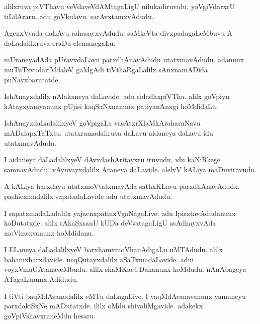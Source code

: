 \documentclass{article}
\begin{document}
\begin{mn}%
alilxruva piVThavu veVdaveVdAMtagaLigU nilukadiruvidu. yoVgiVdarxrU tiLilAraru. adu 
goVkulavu. sarAvxtamxvAdudu.
\end{mn}

\begin{mn}%
AgenxVyada daLAvu rahasayxvAdudu. saMkeVta divxpadagaLeMbuvu A daLadalilxruva eraDu 
elemanegaLu.
\end{mn}

\begin{mn}%
mUraneyadAda pUravxdaLavu parxdhAnavAdudu utatxmavAdudu. adanunx muTuTxvudariMdaleV 
gaMgAdi tiVthaRgaLalilx sAnxnamADida puNayxbarutatde.
\end{mn}

\begin{mn}%
IshAnayxdalilx nAlakxneya daLavide. adu sidadhxpiVTha. alilx goVpiyu kAtayxyaniyanunx pUjisi 
kaqSaNxnanunx patiyanAnxgi hoMdidaLu.
\end{mn}

\begin{mn}%
IshAnayxdaLadalilxyeV goVpigaLa vasAtxrXlaMkAraharaNavu mADalapxTaTxtu. utatxramadaliruva 
daLavu aidaneya daLavu idu utatxmavAdudu.
\end{mn}

\begin{mn}%
I aidaneya daLadalilxyeV dAvxdashAritayxru iruvudu. idu kaNiRkege samnavAdudu. 
vAyuvayxdalilx Araneya daLavide. alelxV kALiya maDuviravudu.
\end{mn}

\begin{mn}%
A kALiya harxdavu utatxmoVtatxmavAda sathxKLavu parxdhAnavAdudx. pashicxmadalilx 
sapatxdaLavide adu utatxmavAdudu.
\end{mn}

\begin{mn}%
I sapatxmadaLadalilx yajacnxpatinxVgaNagaLive. adu IpisxtavAdudanunx koDutatxde. alilx 
rAkaSxsanU kUDa deVvatagaLigU asAdhayxvAda moVkasxvanunx hoMdidanu.
\end{mn}

\begin{mn}%
I ELaneya daLadalilxyeV barxhamxmoVhanAdigaLu uMTAdudu. alilx bahamxharxdavide. 
neqQutayxdalilx  aSaTxmadaLavide. adui voyxVmaGAtanaveMbudu. alilx shaMKacUDananunx 
koMdudu. nAnAbageya ATagaLanunx Adidudu.
\end{mn}

\begin{mn}%
I tiVti baqMdAvanadalilx eMTu daLagaLive. I vaqMdAvanavanunx yamuneyu parxdakiSxNe 
mADutatxde. ililx oMdu shivaliMgavide. adakekx goVpiVshavxraneMdu hesaru.
\end{mn}
\end{document}
